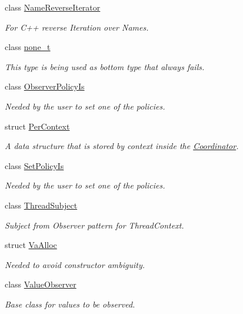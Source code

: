 \begin{DoxyCompactItemize}
class \mbox{\hyperlink{classkdb_1_1NameReverseIterator}{Name\+Reverse\+Iterator}}
\begin{DoxyCompactList}\small\item\em For C++ reverse Iteration over Names. \end{DoxyCompactList}\item 
class \mbox{\hyperlink{classkdb_1_1none__t}{none\+\_\+t}}
\begin{DoxyCompactList}\small\item\em This type is being used as bottom type that always fails. \end{DoxyCompactList}\item 
class \mbox{\hyperlink{classkdb_1_1ObserverPolicyIs}{Observer\+Policy\+Is}}
\begin{DoxyCompactList}\small\item\em Needed by the user to set one of the policies. \end{DoxyCompactList}\item 
struct \mbox{\hyperlink{structkdb_1_1PerContext}{Per\+Context}}
\begin{DoxyCompactList}\small\item\em A data structure that is stored by context inside the \mbox{\hyperlink{classkdb_1_1Coordinator}{Coordinator}}. \end{DoxyCompactList}\item 
class \mbox{\hyperlink{classkdb_1_1SetPolicyIs}{Set\+Policy\+Is}}
\begin{DoxyCompactList}\small\item\em Needed by the user to set one of the policies. \end{DoxyCompactList}\item 
class \mbox{\hyperlink{classkdb_1_1ThreadSubject}{Thread\+Subject}}
\begin{DoxyCompactList}\small\item\em Subject from Observer pattern for Thread\+Context. \end{DoxyCompactList}\item 
struct \mbox{\hyperlink{structkdb_1_1VaAlloc}{Va\+Alloc}}
\begin{DoxyCompactList}\small\item\em Needed to avoid constructor ambiguity. \end{DoxyCompactList}\item 
class \mbox{\hyperlink{classkdb_1_1ValueObserver}{Value\+Observer}}
\begin{DoxyCompactList}\small\item\em Base class for values to be observed. \end{DoxyCompactList}\item 

\end{DoxyCompactItemize}

